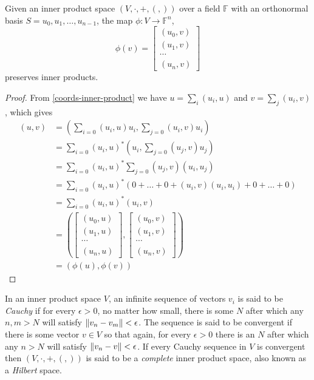 \begin{prop}\label{vectors-tuples}
	Given an inner product space $(V, \cdot, +, (,))$ over a field $\mathbb{F}$ with an orthonormal basis $S = {u_0, u_1, \dots, u_{n-1}}$, the map $\phi:V \to \mathbb{F}^n$, 
	\[\phi(v) = \left[\begin{matrix}
		(u_0, v)\\
		(u_1, v)\\
		\cdots\\
		(u_n, v)
	\end{matrix}\right]\]
preserves inner products.
\end{prop}
\begin{proof}
	From \autoref{coords-inner-product} we have $u = \sum_i (u_i, u)$ and $v = \sum_j (u_i, v)$, which gives
	\begin{align*}
		(u, v)
		&= \left(\sum_{i=0}(u_i, u)u_i, \sum_{j=0} (u_i,v)u_i\right)
		\\&= \sum_{i=0}(u_i, u)^*\left(u_i, \sum_{j=0} (u_j, v)u_j\right)
		\\&= \sum_{i=0}(u_i, u)^*\sum_{j=0} (u_j, v)\left(u_i, u_j\right)
		\\&= \sum_{i=0}(u_i, u)^*\left(0 + \dots + 0 + (u_i, v)\left(u_i, u_i\right) + 0 + \dots + 0\right)
		\\&= \sum_{i=0}(u_i, u)^*(u_i, v)
		\\&= \left(
		\left[\begin{matrix}
			(u_0, u)\\
			(u_1, u)\\
			\cdots\\
			(u_n, u)
		\end{matrix}\right]
		,
		\left[\begin{matrix}
			(u_0, v)\\
			(u_1, v)\\
			\cdots\\
			(u_n, v)
		\end{matrix}\right]
		\right)
		\\&= (\phi(u), \phi(v))
	\end{align*}
\end{proof}

\begin{define}
	In an inner product space $V$, an infinite sequence of vectors $v_i$ is said to be \emph{Cauchy} if for every $\epsilon > 0$, no matter how small, there is some $N$ after which any $n, m > N$ will satisfy $\left\Vert v_n - v_m \right\Vert < \epsilon$. The sequence is said to be convergent if there is some vector $v \in V$ so that again, for every $\epsilon > 0$ there is an $N$ after which any $n > N$ will satisfy $\left\Vert v_n - v \right\Vert < \epsilon$. If every Cauchy sequence in $V$ is convergent then $(V, \cdot, +, (,))$ is said to be a \emph{complete} inner product space, also known as a \emph{Hilbert} space.
\end{define}

